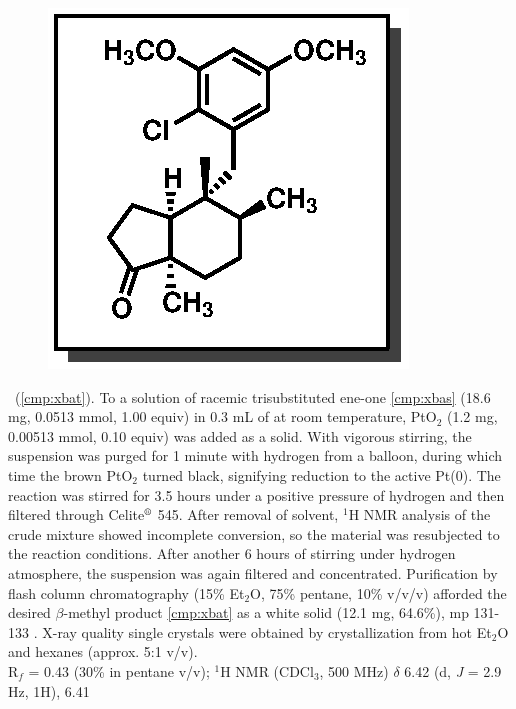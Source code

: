 \begin{figure}
  \vspace{-25pt}
  \begin{center}
    \includegraphics[scale=0.8]{chp_singlecarbon/images/xbat}
  \end{center}
  \vspace{-30pt}
\end{figure}\noindent \textbf{\CMPxbat}\ (\ref{cmp:xbat}). To a solution of racemic
trisubstituted ene-one \ref{cmp:xbas} (18.6 mg, 0.0513 mmol, 1.00 equiv) in 0.3 mL of  at
room temperature, PtO$_2$ (1.2 mg, 0.00513 mmol, 0.10 equiv) was added as a solid. With vigorous
stirring, the suspension was purged for 1 minute with hydrogen from a balloon, during which time the
brown PtO$_2$ turned black, signifying reduction to the active Pt(0). The reaction was stirred for
3.5 hours under a positive pressure of hydrogen and then filtered through
Celite$\textsuperscript{\textregistered}$ 545. After removal of solvent, $^1$H NMR analysis of the
crude mixture showed incomplete conversion, so the material was resubjected to the reaction conditions. After another 6 hours of stirring under hydrogen atmosphere, the
suspension was again filtered and concentrated. Purification by flash column chromatography
(15\% Et$_2$O, 75\% pentane, 10\%  v/v/v) afforded the desired $\beta$-methyl product
\ref{cmp:xbat} as a white solid (12.1 mg, 64.6\%), mp 131-133 \degc. X-ray quality single crystals  were obtained by
crystallization from hot Et$_2$O and hexanes (approx. 5:1 v/v). \\
R$_f$ = 0.43 (30\%  in pentane v/v); $^1$H NMR (CDCl$_3$, 500 MHz) $\delta$ 6.42 (d, \textit{J} = 2.9 Hz, 1H), 6.41
